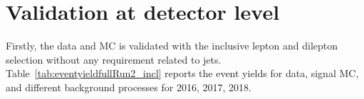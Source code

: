 \documentclass{cernatlasnote}
\begin{document}
\section{Validation at detector level}\label{sec:DatavsMC}
Firstly, the data and MC is validated with the inclusive lepton and dilepton selection without any requirement related to jets. Table~\ref{tab:eventyieldfullRun2_incl} reports the event yields for data, signal MC, and different background processes for 2016, 2017, 2018. 

\end{document}
